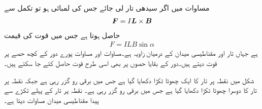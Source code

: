 مساوات  میں اگر سیدھی تار لی جائے جس کی لمبائی  ہو  تو تکمل سے
\begin{align}\label{مساوات_امالہ_سیدھی_تار_قوت_الف}
{\ensuremath{{\boldsymbol{F}}}}=I {{\boldsymbol{L}}} \times {\ensuremath{{\boldsymbol{B}}}}
\end{align}
حاصل ہوتا ہے جس میں قوت کی قیمت
\begin{align}\label{مساوات_امالہ_سیدھی_تار_قوت_ب}
F=I L B \sin \alpha
\end{align}
ہے جہاں تار اور مقناطیسی میدان کے درمیان زاویہ  ہے۔مساوات  اور مساوات  پورے دور کے کچھ حصے پر قوت دیتے ہیں۔دور کے بقایا حصوں پر بھی اسی طرح قوت حاصل کئے جا سکتے ہیں۔

شکل میں نقطہ  پر تار کا ایک چھوٹا ٹکڑا  دکھایا گیا ہے جس میں  برقی رو گزر رہی ہے  جبکہ نقطہ  پر تار کا دوسرا چھوٹا ٹکڑا  دکھایا گیا ہے جس میں  برقی رو گزر رہی ہے۔ نقطہ  پر تار کے پہلے ٹکڑے سے پیدا مقناطیسی میدان مساوات  دیتا ہے۔

